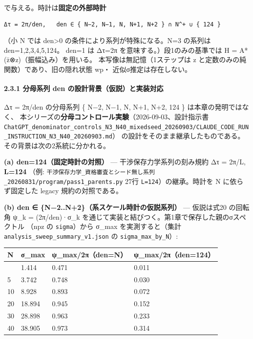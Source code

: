 \documentclass[
  a4paper,
]{ltjsarticle}
\newcounter{none} %
\begin{document}
で与える。時計は\textbf{固定の外部時計}

\begin{verbatim}
Δτ = 2π/den,   den ∈ { N−2, N−1, N, N+1, N+2 } ∩ N^+ ∪ { 124 }
\end{verbatim}

（小 N では den\textgreater0 の条件により系列が特殊になる。N=3 の系列は
den=1,2,3,4,5,124。 den=1 は Δτ=2π を意味する。）段1のみの基準では H =
A*(z̄⊗z)（振幅込み）を用いる。 本写像は無記憶（1ステップは z
と定数のみの純関数）であり、旧の隠れ状態 wp・ 近似σ推定は存在しない。

\paragraph{2.3.1 分母系列 den
の設計背景（仮説）と実装対応}\label{ux5206ux6bcdux7cfbux5217-den-ux306eux8a2dux8a08ux80ccux666fux4eeeux8aacux3068ux5b9fux88c5ux5bfeux5fdc}

Δτ = 2π/den の分母系列 \{ N−2, N−1, N, N+1, N+2, 124 \}
は本章の発明ではなく、
本シリーズの\textbf{分母コントロール実験}（2026-09-03、設計指示書
\texttt{ChatGPT\_denominator\_controls\_N3\_N40\_mixedseed\_20260903/CLAUDE\_CODE\_RUN\_INSTRUCTION\_N3\_N40\_20260903.md}）
の設計をそのまま継承したものである。その背景は次の2系統に分かれる。

\textbf{(a) den=124（固定時計の対照）} --- 干渉保存力学系列の刻み規約 Δτ
= 2π/L, \textbf{L=124} （例:
\texttt{干渉保存力学\_資格審査とシード無し系列\_20260831/program/pass1\_parents.py}
27行 \texttt{L=124}）の継承。時計を N に依らず固定した legacy
規約の対照である。

\textbf{(b) den ∈ \{N−2..N+2\}（系スケール時計の仮説系列）} ---
仮説は式20 の回転角 ψ\_k = (2π/den)·σ\_k
を通じて実装と結びつく。第1章で保存した親のσスペクトル （npz の
\texttt{sigma}）から σ\_max を実測すると（集計
\texttt{analysis\_sweep\_summary\_v1.json} の
\texttt{sigma\_max\_by\_N}）:

{\def\LTcaptype{none} %
\begin{longtable}[]{@{}llll@{}}
\toprule\noalign{}
N & σ\_max & ψ\_max/2π（den=N） & ψ\_max/2π（den=124） \\
\midrule\noalign{}
\endhead
\bottomrule\noalign{}
\endlastfoot
3 & 1.414 & 0.471 & 0.011 \\
5 & 3.742 & 0.748 & 0.030 \\
10 & 8.928 & 0.893 & 0.072 \\
20 & 18.894 & 0.945 & 0.152 \\
30 & 28.898 & 0.963 & 0.233 \\
40 & 38.905 & 0.973 & 0.314 \\
\end{longtable}
}
\end{document}
